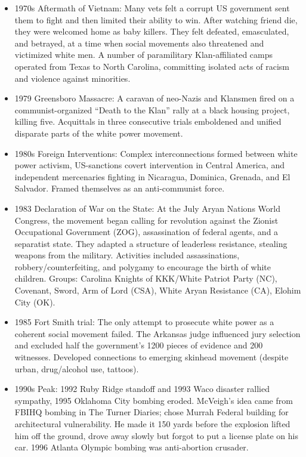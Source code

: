 \documentclass[
]{article}
\begin{document}
\begin{itemize}
\item
  1970s Aftermath of Vietnam: Many vets felt a corrupt US government
  sent them to fight and then limited their ability to win. After
  watching friend die, they were welcomed home as baby killers. They
  felt defeated, emasculated, and betrayed, at a time when social
  movements also threatened and victimized white men. A number of
  paramilitary Klan-affiliated camps operated from Texas to North
  Carolina, committing isolated acts of racism and violence against
  minorities.
\item
  1979 Greensboro Massacre: A caravan of neo-Nazis and Klansmen fired on
  a communist-organized ``Death to the Klan'' rally at a black housing
  project, killing five. Acquittals in three consecutive trials
  emboldened and unified disparate parts of the white power movement.
\item
  1980s Foreign Interventions: Complex interconnections formed between
  white power activism, US-sanctions covert intervention in Central
  America, and independent mercenaries fighting in Nicaragua, Dominica,
  Grenada, and El Salvador. Framed themselves as an anti-communist
  force.
\item
  1983 Declaration of War on the State: At the July Aryan Nations World
  Congress, the movement began calling for revolution against the
  Zionist Occupational Government (ZOG), assassination of federal
  agents, and a separatist state. They adapted a structure of leaderless
  resistance, stealing weapons from the military. Activities included
  assassinations, robbery/counterfeiting, and polygamy to encourage the
  birth of white children. Groups: Carolina Knights of KKK/White Patriot
  Party (NC), Covenant, Sword, Arm of Lord (CSA), White Aryan Resistance
  (CA), Elohim City (OK).
\item
  1985 Fort Smith trial: The only attempt to prosecute white power as a
  coherent social movement failed. The Arkansas judge influenced jury
  selection and excluded half the government's 1200 pieces of evidence
  and 200 witnesses. Developed connections to emerging skinhead movement
  (despite urban, drug/alcohol use, tattoos).
\item
  1990s Peak: 1992 Ruby Ridge standoff and 1993 Waco disaster rallied
  sympathy, 1995 Oklahoma City bombing eroded. McVeigh's idea came from
  FBIHQ bombing in The Turner Diaries; chose Murrah Federal building for
  architectural vulnerability. He made it 150 yards before the explosion
  lifted him off the ground, drove away slowly but forgot to put a
  license plate on his car. 1996 Atlanta Olympic bombing was
  anti-abortion crusader.
\end{itemize}
\end{document}
